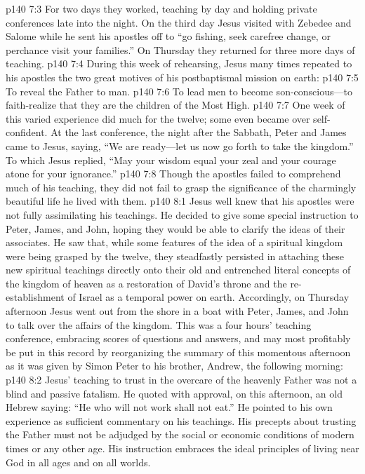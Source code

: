 \vs p140 7:3 For two days they worked, teaching by day and holding private conferences late into the night. On the third day Jesus visited with Zebedee and Salome while he sent his apostles off to \textcolor{ubdarkred}{“go fishing, seek carefree change, or perchance visit your families.”} On Thursday they returned for three more days of teaching.\plusone
\vs p140 7:4 During this week of rehearsing, Jesus many times repeated to his apostles the two great motives of his postbaptismal mission on earth:
\pc \vs p140 7:5 \bibnobreakspace To reveal the Father to man.
\vs p140 7:6 \bibnobreakspace To lead men to become son\hyp{}con\-scious---to faith\hyp{}realize that they are the children of the Most High.
\pc \vs p140 7:7 One week of this varied experience did much for the twelve; some even became over self\hyp{}confident. At the last conference, the night after the Sabbath, Peter and James came to Jesus, saying, “We are ready---let us now go forth to take the kingdom.” To which Jesus replied, \textcolor{ubdarkred}{“May your wisdom equal your zeal and your courage atone for your ignorance.”}
\vs p140 7:8 Though the apostles failed to comprehend much of his teaching, they did not fail to grasp the significance of the charmingly beautiful life he lived with them.
\vs p140 8:1 Jesus well knew that his apostles were not fully assimilating his teachings. He decided to give some special instruction to Peter, James, and John, hoping they would be able to clarify the ideas of their associates. He saw that, while some features of the idea of a spiritual kingdom were being grasped by the twelve, they steadfastly persisted in attaching these new spiritual teachings directly onto their old and entrenched literal concepts of the kingdom of heaven as a restoration of David’s throne and the re\hyp{}establishment of Israel as a temporal power on earth. Accordingly, on Thursday afternoon Jesus went out from the shore in a boat with Peter, James, and John to talk over the affairs of the kingdom. This was a four hours’ teaching conference, embracing scores of questions and answers, and may most profitably be put in this record by reorganizing the summary of this momentous afternoon as it was given by Simon Peter to his brother, Andrew, the following morning:
\pc \vs p140 8:2 \bibnobreakspace {} Jesus’ teaching to trust in the overcare of the heavenly Father was not a blind and passive fatalism. He quoted with approval, on this afternoon, an old Hebrew saying: \textcolor{ubdarkred}{“He who will not work shall not eat.”} He pointed to his own experience as sufficient commentary on his teachings. His precepts about trusting the Father must not be adjudged by the social or economic conditions of modern times or any other age. His instruction embraces the ideal principles of living near God in all ages and on all worlds.

